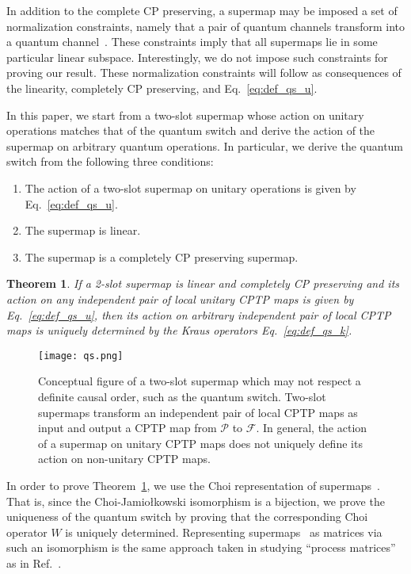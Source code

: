\documentclass[a4paper,twocolumn,accepted=2022-10-23]{quantumarticle}
\newcommand{\fcal}[0]{{\mathcal{F}}}
\newcommand{\pcal}[0]{{\mathcal{P}}}
\newcommand{\Jamiolkowski}[0]{{Jamio\l kowski}}
\newtheorem{thm}{Theorem}
\theoremstyle{definition}
\begin{document}
In addition to the complete CP preserving, a supermap may be imposed a set of normalization constraints, namely that a pair of quantum channels transform into a quantum channel~\cite{qswitch}. These constraints imply that all supermaps lie in some particular linear subspace. Interestingly, we do not impose such constraints for proving our result. These normalization constraints will follow as consequences of the linearity, completely CP preserving, and Eq.~\eqref{eq:def_qs_u}.



In this paper, we start from a two-slot supermap whose action on unitary operations matches that of the quantum switch and derive the action of the supermap on arbitrary quantum operations.
In particular,
we derive the quantum switch from the following three conditions:
 \begin{enumerate}
 \item The action of a two-slot supermap on unitary operations is given by Eq.~\eqref{eq:def_qs_u}.
 \item The supermap is linear.
 \item The supermap is a completely CP preserving supermap.
 \end{enumerate}

\begin{thm}\label{thm:qs_unique}
If a 2-slot supermap is linear and completely CP preserving and its
action on any independent pair of local unitary CPTP maps is given by Eq.~\eqref{eq:def_qs_u},
then its action on arbitrary independent pair of local CPTP maps is uniquely determined by the Kraus operators Eq.~\eqref{eq:def_qs_k}.
\end{thm}



\begin{figure}
\centering
\texttt{[image: qs.png]}
\caption{Conceptual figure of a two-slot supermap which may not respect a definite causal order, such as the quantum switch. Two-slot supermaps transform an independent pair of local CPTP maps as input and output a CPTP map from $\pcal$ to $ \fcal$. In general, the action of a supermap on unitary CPTP maps does not uniquely define its action on non-unitary CPTP maps.
}\label{fig:qs}
\end{figure}

In order to prove Theorem~\ref{thm:qs_unique}, we use the Choi representation of supermaps~\cite{comb1,comb2,choi,jamiolkowski}.
That is, since the Choi-{\Jamiolkowski} isomorphism is a bijection,
we prove the uniqueness of the quantum switch by proving that the corresponding Choi operator $W$ is uniquely determined.
Representing supermaps~\cite{comb2} as matrices via such an isomorphism is the same approach taken in studying “process matrices” as in Ref.~\cite{Oreshkov_2016}.
\end{document}
